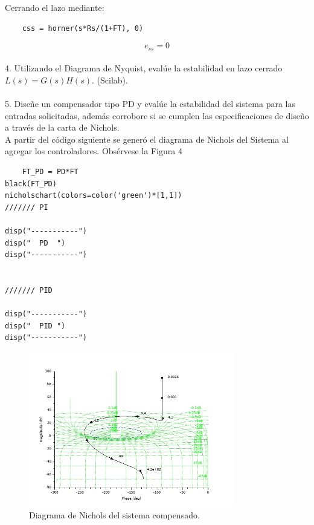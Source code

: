 \documentclass[12pt,letterpaper]{article}
\begin{document}
Cerrando el lazo mediante:

\begin{verbatim}
    css = horner(s*Rs/(1+FT), 0)
\end{verbatim}

\begin{equation}
    e_{ss} = 0
\end{equation}
\\

4. Utilizando el Diagrama de Nyquist, evalúe la estabilidad en lazo cerrado $L(s) = G(s)H(s)$. (Scilab).\\
\\



5. Diseñe un compensador tipo PD y evalúe la estabilidad del sistema para las entradas solicitadas, además corrobore si se cumplen las especificaciones de diseño a través de la carta de Nichols.\\

A partir del código siguiente se generó el diagrama de Nichols del Sistema al agregar los controladores. Obsérvese la Figura 4

\begin{verbatim}
    FT_PD = PD*FT
black(FT_PD)
nicholschart(colors=color('green')*[1,1])
/////// PI

disp("-----------")
disp(" 	PD	")
disp("-----------")


/////// PID

disp("-----------")
disp(" 	PID	")
disp("-----------")

\end{verbatim}

\begin{figure}
  \centering
    \includegraphics[width=0.8\textwidth]{nichols.jpg}
  \caption{Diagrama de Nichols del sistema compensado.}
  \label{fig:ejemplo}
\end{figure}
\end{document}
